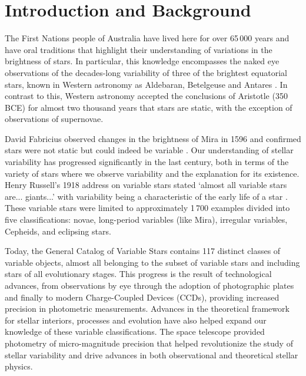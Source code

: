 \chapter{Introduction and Background}
\label{chap:intro}

The First Nations people of Australia have lived here for over 65\,000 years and have oral traditions that highlight their understanding of variations in the brightness of stars. In particular, this knowledge encompasses the naked eye observations of the decades-long variability of three of the brightest equatorial stars, known in Western astronomy as Aldebaran, Betelgeuse and Antares \citep{hamacher_observations_2018}. In contrast to this, Western astronomy accepted the conclusions of Aristotle (350 BCE) for almost two thousand years that stars are static, with the exception of observations of supernovae. 

David Fabricius observed changes in the brightness of Mira in 1596 and confirmed stars were not static but could indeed be variable \citep{hoffleit_history_1997}. Our understanding of stellar variability has progressed significantly in the last century, both in terms of the variety of stars where we observe variability and the explanation for its existence. Henry Russell's 1918 address on variable stars stated `almost all variable stars are... giants...' with variability being a characteristic of the early life of a star \citep{payne-gaposchkin_development_1978}. These variable stars were limited to approximately 1\,700 examples divided into five classifications: novae, long-period variables (like Mira), irregular variables, Cepheids, and eclipsing stars. 

Today, the General Catalog of Variable Stars \citep{samus_general_2017} contains 117 distinct classes of variable objects, almost all belonging to the subset of variable stars and including stars of all evolutionary stages. This progress is the result of technological advances, from observations by eye through the adoption of photographic plates and finally to modern Charge-Coupled Devices (CCDs), providing increased precision in photometric measurements. Advances in the theoretical framework for stellar interiors, processes and evolution have also helped expand our knowledge of these variable classifications. The \Kepler{} space telescope provided photometry of micro-magnitude precision that helped revolutionize the study of stellar variability and drive advances in both observational and theoretical stellar physics.

